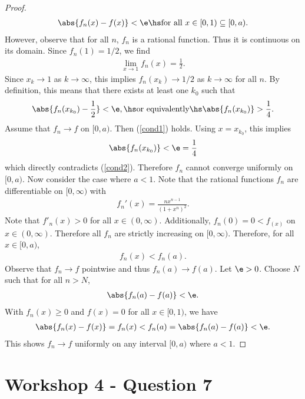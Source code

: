 \documentclass{article}
\begin{document}
\begin{proof}
	\begin{align}
		\label{cond1}
		\abs{f_n(x)-f(x)} < \e \hs\text{for all }x\in [0, 1) \subseteq [0, a).
	\end{align}
	However, observe that for all $n$, $f_n$ is a rational function. Thus it is
	continuous on its domain. Since $f_n(1)=1/2$, we find
	\begin{align*}
		\lim_{x\to 1} f_n(x) = \frac{1}{2}.
	\end{align*}
	Since $x_k\to 1$ as $k\to\infty$, this implies $f_n(x_k)\to 1/2$ as $k\to\infty$ for all $n$.
	By definition, this means that there exists at least one $k_0$ such that
	\begin{align}
		\label{cond2}
		\abs{f_n(x_{k_0}) - \frac{1}{2}} < \e, \hs\text{or equivalently}\hs \abs{f_n(x_{k_0})} > \frac{1}{4}.
	\end{align}
	Assume that $f_n\to f$ on $[0, a)$. Then (\ref{cond1}) holds. Using $x=x_{k_0}$, this implies
	\begin{align*}
		\abs{f_n(x_{k_0})} < \e = \frac{1}{4}
	\end{align*}
	which directly contradicts (\ref{cond2}). Therefore $f_n$ cannot converge uniformly on $[0, a)$.
	Now consider the case where $a<1$.
	Note that the rational functions $f_n$ are differentiable on $[0, \infty)$ with
	\begin{align*}
		f_n'(x) =  \frac{nx^{n-1}}{(1+x^n)^2}.
	\end{align*}
	Note that $f'_n(x)>0$ for all $x\in(0,\infty)$. Additionally, $f_n(0) = 0 < f_(x)$ on $x\in(0, \infty)$.
	Therefore all $f_n$ are strictly increasing on $[0, \infty)$. Therefore, for all $x\in[0,a)$,
	\begin{align}
		f_n(x) < f_n(a).
	\end{align}
	Observe that $f_n\to f$ pointwise and thus $f_n(a)\to f(a)$. Let $\e>0$. Choose $N$ such that
	for all $n>N$,
	\begin{align*}
		\abs{f_n(a)-f(a)} < \e.
	\end{align*}
	With $f_n(x)\geq 0$ and $f(x)=0$ for all $x\in[0,1)$, we have
	\begin{align*}
		\abs{f_n(x)-f(x)}=f_n(x)<f_n(a)=\abs{f_n(a) - f(a)} < \e.
	\end{align*}
	This shows $f_n\to f$ uniformly on any interval $[0, a)$ where $a<1$.
\end{proof}

\section*{Workshop 4 - Question 7}
\end{document}
